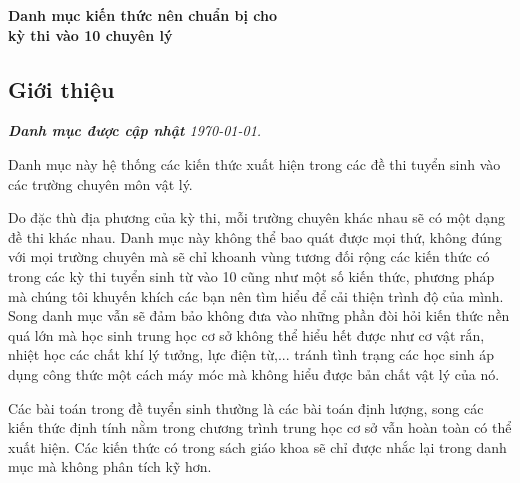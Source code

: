 \documentclass{article}
\begin{document}
\begin{center}
    {\Huge\textbf{Danh mục kiến thức nên chuẩn bị cho \\ kỳ thi vào 10 chuyên lý}}
\end{center}

\begin{multicols}{2}
\section{Giới thiệu}
\textit{\textbf{Danh mục được cập nhật} \today. } \vspace{3mm}

Danh mục này hệ thống các kiến thức xuất hiện trong các đề thi tuyển sinh vào các trường chuyên môn vật lý. 


Do đặc thù địa phương của kỳ thi, mỗi trường chuyên khác nhau sẽ có một dạng đề thi khác nhau. Danh mục này không thể bao quát được mọi thứ, không đúng với mọi trường chuyên mà sẽ chỉ khoanh vùng tương đối rộng các kiến thức có trong các kỳ thi tuyển sinh từ vào 10 cũng như một số kiến thức, phương pháp mà chúng tôi khuyến khích các bạn nên tìm hiểu để cải thiện trình độ của mình. Song danh mục vẫn sẽ đảm bảo không đưa vào những phần đòi hỏi kiến thức nền quá lớn mà học sinh trung học cơ sở không thể hiểu hết được như cơ vật rắn, nhiệt học các chất khí lý tưởng, lực điện từ,... tránh tình trạng các học sinh áp dụng công thức một cách máy móc mà không hiểu được bản chất vật lý của nó.

Các bài toán trong đề tuyển sinh thường là các bài toán định lượng, song các kiến thức định tính nằm trong chương trình trung học cơ sở vẫn hoàn toàn có thể xuất hiện. Các kiến thức có trong sách giáo khoa sẽ chỉ được nhắc lại trong danh mục mà không phân tích kỹ hơn.


\end{multicols}
\end{document}
